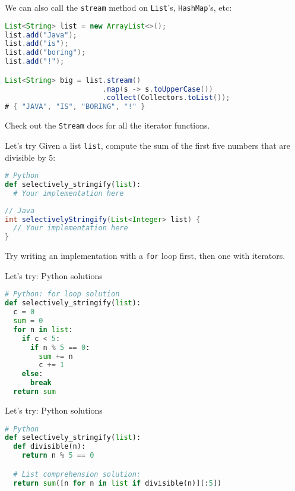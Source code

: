 \documentclass[../index.tex]{subfiles}
\begin{document}
\begin{frame}[fragile]{\currenttitle}
  We can also call the \texttt{stream} method on \texttt{List}'s,
  \texttt{HashMap}'s, etc:

  \begin{lstlisting}[language=Java]
List<String> list = new ArrayList<>();
list.add("Java");
list.add("is");
list.add("boring");
list.add("!");

List<String> big = list.stream()
                       .map(s -> s.toUpperCase())
                       .collect(Collectors.toList());
# { "JAVA", "IS", "BORING", "!" }
  \end{lstlisting}

  Check out the \texttt{Stream} docs for all the iterator functions.
\end{frame}

\renewcommand{\currenttitle}{Let's try}
\begin{frame}[fragile]{\currenttitle}
  Given a list \texttt{list}, compute the sum of the first five numbers that
  are divisible by 5:

  \begin{lstlisting}[language=Python]
# Python
def selectively_stringify(list):
  # Your implementation here
  \end{lstlisting}

  \begin{lstlisting}[language=Java]
// Java
int selectivelyStringify(List<Integer> list) {
  // Your implementation here
}
  \end{lstlisting}

  Try writing an implementation with a \texttt{for} loop first, then one with
  iterators.

\end{frame}

\renewcommand{\currenttitle}{Let's try: Python solutions}
\begin{frame}[fragile]{\currenttitle}
  \begin{lstlisting}[language=Python]
# Python: for loop solution
def selectively_stringify(list):
  c = 0
  sum = 0
  for n in list:
    if c < 5:
      if n % 5 == 0:
        sum += n
        c += 1
    else:
      break
  return sum
  \end{lstlisting}
\end{frame}

\begin{frame}[fragile]{\currenttitle}
  \begin{lstlisting}[language=Python]
# Python
def selectively_stringify(list):
  def divisible(n):
    return n % 5 == 0

  # List comprehension solution:
  return sum([n for n in list if divisible(n)][:5])
  \end{lstlisting}
\end{frame}
\end{document}
